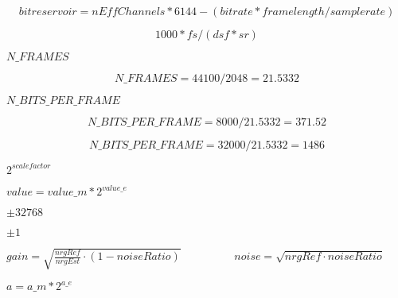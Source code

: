 \documentclass{article}
\begin{document}
\[ bitreservoir = nEffChannels*6144 - (bitrate*framelength/samplerate) \]
\pagebreak

\[ 1000 * fs / (dsf * sr) \]
\pagebreak

$N\_FRAMES$
\pagebreak

\[ N\_FRAMES = 44100 / 2048 = 21.5332 \]
\pagebreak

$N\_BITS\_PER\_FRAME$
\pagebreak

\[ N\_BITS\_PER\_FRAME = 8000 / 21.5332 = 371.52 \]
\pagebreak

\[ N\_BITS\_PER\_FRAME = 32000 / 21.5332 = 1486 \]
\pagebreak

$ 2^{scalefactor} $
\pagebreak

$ value = value\_m * 2^{value\_e} $
\pagebreak

$\pm 32768 $
\pagebreak

$ \pm 1$
\pagebreak

$ gain = \sqrt{ \frac{nrgRef}{nrgEst} \cdot (1 - noiseRatio) } \hspace{2cm} noise = \sqrt{ nrgRef \cdot noiseRatio } $
\pagebreak

$ a = a\_m * 2^{a\_e} $
\pagebreak
\end{document}
